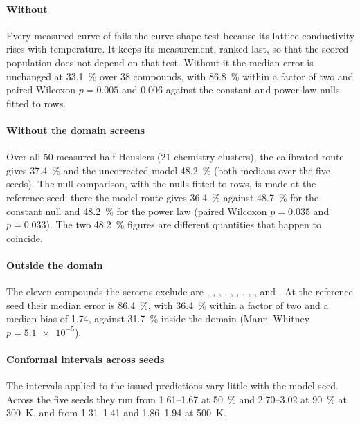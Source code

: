 \documentclass[preprint, 12pt]{elsarticle}
\begin{document}
\paragraph{Without } Every measured curve of  fails the curve-shape test because
its lattice conductivity rises with temperature. It keeps its measurement, ranked last, so that the
scored population does not depend on that test. Without it the median error is unchanged at
\SI{33.1}{\percent} over \num{38} compounds, with \SI{86.8}{\percent} within a factor of two and
paired Wilcoxon $p=\num{0.005}$ and \num{0.006} against the constant and power-law nulls fitted to rows.

\paragraph{Without the domain screens} Over all \num{50} measured half Heuslers (\num{21}
chemistry clusters), the calibrated route gives \SI{37.4}{\percent} and the uncorrected model
\SI{48.2}{\percent} (both medians over the five seeds). The null comparison, with the nulls fitted to rows, is made at the reference seed: there the model route gives \SI{36.4}{\percent} against \SI{48.7}{\percent} for the constant
null and \SI{48.2}{\percent} for the power law (paired Wilcoxon $p=\num{0.035}$ and
$p=\num{0.033}$). The two \SI{48.2}{\percent} figures are different quantities that happen to
coincide.

\paragraph{Outside the domain} The eleven compounds the screens exclude are ,
, , , , , , ,
,  and . At the reference seed their median error is
\SI{86.4}{\percent}, with \SI{36.4}{\percent} within a factor of two and a median bias of
\num{1.74}, against \SI{31.7}{\percent} inside the domain (Mann--Whitney $p=\num{5.1e-5}$).

\paragraph{Conformal intervals across seeds} The intervals applied to the issued predictions vary little
with the model seed. Across the five seeds they run from \numrange{1.61}{1.67} at \SI{50}{\percent}
and \numrange{2.70}{3.02} at \SI{90}{\percent} at \SI{300}{\kelvin}, and from \numrange{1.31}{1.41}
and \numrange{1.86}{1.94} at \SI{500}{\kelvin}.
\end{document}

